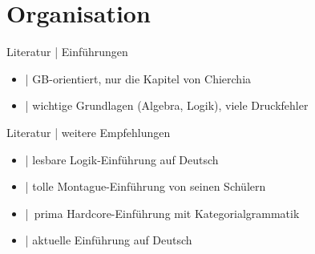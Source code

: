 
\section{Organisation}

\begin{frame}
  {Literatur | Einführungen}
  \onslide<+->
  \begin{itemize}[<+->]
    \item \alert{\citet{ChierchiaMcconnellginet2000}} | GB-orientiert, nur die Kapitel von Chierchia
    \item \alert{\citet{ParteeEa1990}} | wichtige Grundlagen (Algebra, Logik), viele Druckfehler
  \end{itemize}
\end{frame}

\begin{frame}
  {Literatur | weitere Empfehlungen}
  \onslide<+->
  \begin{itemize}[<+->]
    \item \alert{\citet{Bucher1998}} | lesbare Logik-Einführung auf Deutsch
    \item \alert{\citet{DowtyEa1981}} | tolle Montague-Einführung von seinen Schülern
    \item \alert{\citet{Carpenter1997}} | prima Hardcore-Einführung mit Kategorialgrammatik
    \item \alert{\citet{Gutzmann2019}} | aktuelle Einführung auf Deutsch
  \end{itemize}
\end{frame}


